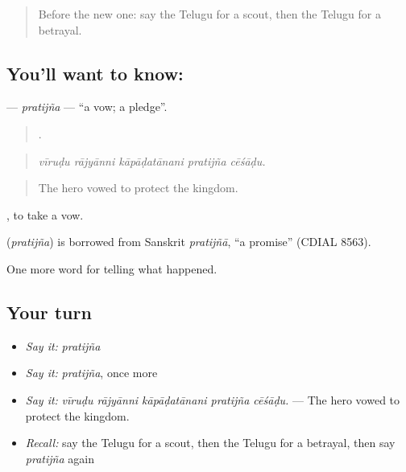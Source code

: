 \label{lesson:TE-C365-pratijna}



\begin{quote}
Before the new one: say the Telugu for a scout, then the Telugu for a betrayal.
\end{quote}

\subsection*{You'll want to know: }
\textbf{} — \emph{pratijña} — \textquotedblleft{}a vow; a pledge\textquotedblright{}.

\begin{quote}
    .
\end{quote}

\begin{quote}
\emph{vīruḍu rājyānni kāpāḍatānani pratijña cēśāḍu.}
\end{quote}

\begin{quote}
The hero vowed to protect the kingdom.
\end{quote}

 , to take a vow.

\begin{cousinweb}
\textbf{} (\emph{pratijña}) is borrowed from Sanskrit \emph{pratijñā}, \textquotedblleft{}a promise\textquotedblright{} (CDIAL 8563).
\end{cousinweb}

\begin{grammarlens}[title={What you've built}]
One more word for telling what happened.
\end{grammarlens}

\subsection*{Your turn}
\begin{itemize}
\raggedright
  \item \emph{Say it:} \emph{pratijña}
  \item \emph{Say it:} \emph{pratijña}, once more
  \item \emph{Say it:} \emph{vīruḍu rājyānni kāpāḍatānani pratijña cēśāḍu.} — The hero vowed to protect the kingdom.
  \item \emph{Recall:} say the Telugu for a scout, then the Telugu for a betrayal, then say \emph{pratijña} again
\end{itemize}

